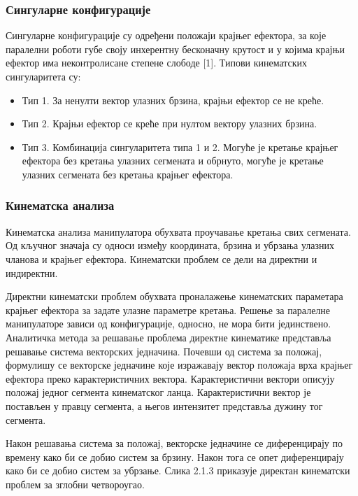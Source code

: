 \documentclass[12pt]{article}
\begin{document}
\subsubsection{Сингуларне конфигурације}
Сингуларне конфигурације су одређени положаји крајњег ефектора, за које паралелни роботи губе своју инхерентну бесконачну крутост и у којима крајњи ефектор има неконтролисане степене слободе [1]. Типови кинематских сингуларитета су:
\begin{itemize}
    \item Тип 1. За ненулти вектор улазних брзина, крајњи ефектор се не креће.
    \item Тип 2. Крајњи ефектор се креће при нултом вектору улазних брзина.
    \item Тип 3. Комбинација сингуларитета типа 1 и 2. Могуће је кретање крајњег ефектора без кретања улазних сегмената и обрнуто, могуће је кретање улазних сегмената без кретања крајњег ефектора.
\end{itemize}

\subsubsection{Кинематска анализа}
Кинематска анализа манипулатора обухвата проучавање кретања свих сегмената. Од кључног значаја су односи између координата, брзина и убрзања улазних чланова и крајњег ефектора. Кинематски проблем се дели на директни и индиректни.

Директни кинематски проблем обухвата проналажење кинематских параметара крајњег ефектора за задате улазне параметре кретања. Решење за паралелне манипулаторе зависи од конфигурације, односно, не мора бити јединствено. Аналитичка метода за решавање проблема директне кинематике представља решавање система векторских једначина. Почевши од система за положај, формулишу се векторске једначине које изражавају вектор положаја врха крајњег ефектора преко карактеристичних вектора. Карактеристични вектори описују положај једног сегмента кинематског ланца. Карактеристични вектор је постављен у правцу сегмента, а његов интензитет представља дужину тог сегмента.

Након решавања система за положај, векторске једначине се диференцирају по времену како би се добио систем за брзину. Након тога се опет диференцирају како би се добио систем за убрзање. Слика 2.1.3 приказује директан кинематски проблем за зглобни четвороугао.
\end{document}
